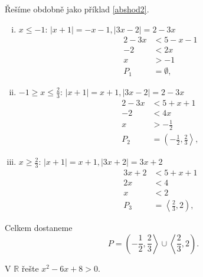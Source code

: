 \begin{reseni}
	Řešíme obdobně jako příklad \ref{abshod2}.
	\begin{enumerate}[i.]
		\item $x \leq -1$: $|x+1|=-x-1, |3x-2|=2-3x$
		\begin{align*}
			2-3x&<5-x-1\\
			-2&<2x\\
			x&>-1\\
			P_1&=\emptyset,
		\end{align*}
		\item $-1 \geq x \leq \frac{2}{3}$: $|x+1|=x+1, |3x-2|=2-3x$
		\begin{align*}
			2-3x&<5+x+1\\
			-2&<4x\\
			x&>-\frac{1}{2}\\
			P_2&=\left(-\frac{1}{2}, \frac{2}{3}\right>,
		\end{align*}
		\item $x \geq \frac{2}{3}$: $|x+1|=x+1, |3x+2|=3x+2$
		\begin{align*}
			3x+2&<5+x+1\\
			2x&<4\\
			x&<2\\
			P_3 &= \left<\frac{2}{3}, 2\right),
		\end{align*}
	\end{enumerate}
	Celkem dostaneme
	$$P = \left(-\frac{1}{2}, \frac{2}{3}\right> \cup \left<\frac{2}{3}, 2\right).$$
\end{reseni}

\begin{priklad}\label{kvadnerce}
V $\mathbb R$ řešte $x^2-6x+8 >0.$
\end{priklad}

